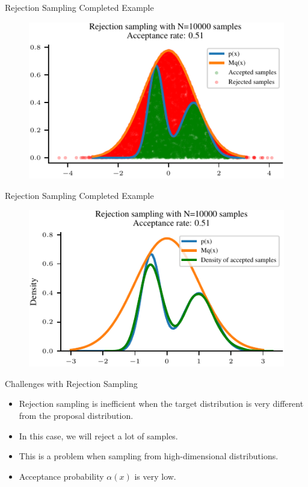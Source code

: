 \documentclass[handout]{beamer}
\begin{document}
    \begin{frame}{Rejection Sampling Completed Example}
        \begin{figure}
            \centering
            \includegraphics{notebooks/figures/sampling/rejection-sampling-N10000-False.pdf}
        \end{figure}
    \end{frame}

    \begin{frame}{Rejection Sampling Completed Example}
        \begin{figure}
            \centering
            \includegraphics{notebooks/figures/sampling/rejection-sampling-N10000-True.pdf}
        \end{figure}
    \end{frame}
        

    \begin{frame}{Challenges with Rejection Sampling}
        \begin{itemize}
            \item Rejection sampling is inefficient when the target distribution is very different from the proposal distribution.
            \item In this case, we will reject a lot of samples.
            \item This is a problem when sampling from high-dimensional distributions.
            \item Acceptance probability $\alpha(x)$ is very low.
        \end{itemize}
        
    \end{frame}
    
\end{document}
